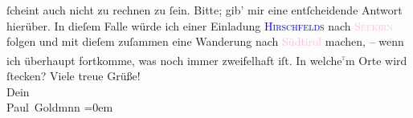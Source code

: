                ſcheint auch nicht {\pb}zu rechnen zu ſein. Bitte; gib’
               mir eine entſcheidende Antwort hierüber. In dieſem Falle würde ich einer Einladung
                  \textsc{\textcolor{blue}{Hirschfeld}{}\ledrightnote{\textcolor{blue}{Robert Hirschfeld}}s} nach \textsc{\textcolor{pink}{Seekirn}{}\ledrightnote{\textcolor{pink}{Sekirn}}} folgen und mit dieſem zuſammen  eine Wanderung nach \textcolor{pink}{Südtirol}{}\ledrightnote{\textcolor{pink}{Südtirol}} machen, – wenn ich überhaupt fortkomme\strikeout{\textcolor{gray}{n}}, was noch immer zweifelhaft iſt.\pend
           \pstart
           {\pb}In welche\substVorne{}\textsuperscript{\textcolor{gray}{r}}\substDazwischen{}m\substHinten{} Orte wird \label{K_L02922-5v}\label{K_L02922-5h} ſtecken?\pend
           \pstart
           Viele treue Grüße! {\\[\baselineskip]}Dein {\\[\baselineskip]}\spacefill\mbox{Paul Goldmnn}\pend
           \leftskip=0em{}\endnumbering{}  
      